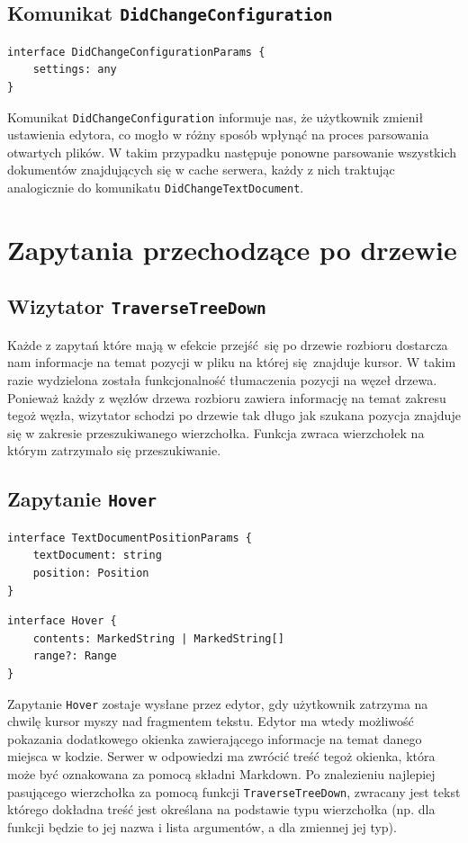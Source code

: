 \subsection{Komunikat \texttt{DidChangeConfiguration}}
\begin{lstlisting}[title=Struktura argumentu komunikatu]
interface DidChangeConfigurationParams {
    settings: any
}
\end{lstlisting}
Komunikat \texttt{DidChangeConfiguration} informuje nas, że użytkownik zmienił ustawienia edytora, co mogło w różny sposób wpłynąć na proces parsowania otwartych plików. W takim przypadku następuje ponowne parsowanie wszystkich dokumentów znajdujących się w cache serwera, każdy z nich traktując analogicznie do komunikatu \texttt{DidChangeTextDocument}.

\section{Zapytania przechodzące po drzewie}
\subsection{Wizytator \texttt{TraverseTreeDown}}
Każde z zapytań które mają w efekcie przejść się po drzewie rozbioru dostarcza nam informacje na temat pozycji w pliku na której się znajduje kursor. W takim razie wydzielona została funkcjonalność tłumaczenia pozycji na węzeł drzewa. Ponieważ każdy z węzłów drzewa rozbioru zawiera informację na temat zakresu tegoż węzła, wizytator schodzi po drzewie tak długo jak szukana pozycja znajduje się w zakresie przeszukiwanego wierzchołka. Funkcja zwraca wierzchołek na którym zatrzymało się przeszukiwanie.

\subsection{Zapytanie \texttt{Hover}}
\begin{lstlisting}[title=Struktura argumentu zapytania]
interface TextDocumentPositionParams {
    textDocument: string
    position: Position
}
\end{lstlisting}

\begin{lstlisting}[title=Struktura odpowiedzi]
interface Hover {
    contents: MarkedString | MarkedString[]
    range?: Range
}
\end{lstlisting}
Zapytanie \texttt{Hover} zostaje wysłane przez edytor, gdy użytkownik zatrzyma na chwilę kursor myszy nad fragmentem tekstu. Edytor ma wtedy możliwość pokazania dodatkowego okienka zawierającego informacje na temat danego miejsca w kodzie. Serwer w odpowiedzi ma zwrócić treść tegoż okienka, która może być oznakowana za pomocą składni Markdown. Po znalezieniu najlepiej pasującego wierzchołka za pomocą funkcji \texttt{TraverseTreeDown}, zwracany jest tekst którego dokładna treść jest określana na podstawie typu wierzchołka (np. dla funkcji będzie to jej nazwa i lista argumentów, a dla zmiennej jej typ).

